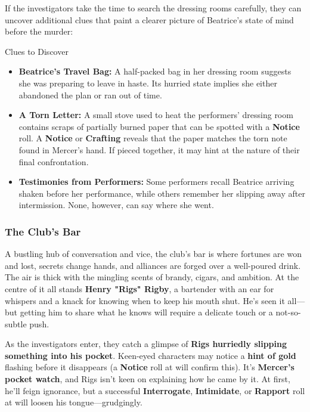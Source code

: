 If the investigators take the time to search the dressing rooms carefully, they can uncover additional clues that paint a clearer picture of Beatrice’s state of mind before the murder:  

\begin{CommentBox}{Clues to Discover}
	\begin{itemize}\raggedright
		\item \textbf{Beatrice’s Travel Bag:} A half-packed bag in her dressing room suggests she was preparing to leave in haste. Its hurried state implies she either abandoned the plan or ran out of time.
		\item \textbf{A Torn Letter:} A small stove used to heat the performers' dressing room contains scraps of partially burned paper that can be spotted with a  \textbf{Notice} roll. A  \textbf{Notice} or \textbf{Crafting} reveals that the paper matches the torn note found in Mercer’s hand. If pieced together, it may hint at the nature of their final confrontation.
		\item \textbf{Testimonies from Performers:} Some performers recall Beatrice arriving shaken before her performance, while others remember her slipping away after intermission. None, however, can say where she went.
	\end{itemize}
\end{CommentBox}



\subsubsection{The Club’s Bar}  
A bustling hub of conversation and vice, the club’s bar is where fortunes are won and lost, secrets change hands, and alliances are forged over a well-poured drink. The air is thick with the mingling scents of brandy, cigars, and ambition. At the centre of it all stands \textbf{Henry "Rigs" Rigby}, a bartender with an ear for whispers and a knack for knowing when to keep his mouth shut. He’s seen it all—but getting him to share what he knows will require a delicate touch or a not-so-subtle push.

As the investigators enter, they catch a glimpse of \textbf{Rigs hurriedly slipping something into his pocket}. Keen-eyed characters may notice a \textbf{hint of gold} flashing before it disappears (a \textbf{Notice} roll at  will confirm this). It’s \textbf{Mercer’s pocket watch}, and Rigs isn’t keen on explaining how he came by it. At first, he’ll feign ignorance, but a successful \textbf{Interrogate}, \textbf{Intimidate}, or \textbf{Rapport} roll at \Formidable will loosen his tongue—grudgingly.

